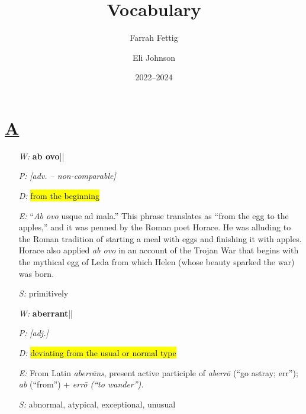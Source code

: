 \documentclass[11pt, table, dvipsnames, svgnames, x11names, xcdraw, titlepage]{article}
\title{Vocabulary}
\author{
    Farrah Fettig \and
    Eli Johnson
	}
\date{2022–2024}
\begin{document}

\maketitle




\section*{\underline{A}}

\begin{itemize}[itemsep=0pt, topsep=0pt]
\item[\textit{W:}] \textbf{ab ovo}\quad || \quad {}
\item[\textit{P:}] \textit{[adv. – non-comparable]}
\item[\textit{D:}] \hl{from the beginning}
\item[\textit{E:}] ``\textit{Ab ovo} usque ad mala.'' This phrase translates as ``from the egg to the apples,'' and it was penned by the Roman poet Horace. He was alluding to the Roman tradition of starting a meal with eggs and finishing it with apples. Horace also applied \textit{ab ovo} in an account of the Trojan War that begins with the mythical egg of Leda from which Helen (whose beauty sparked the war) was born.
\item[\textit{S:}] primitively
\end{itemize}

\null

\begin{itemize}[itemsep=0pt, topsep=0pt]
\item[\textit{W:}] \textbf{aberrant}\quad || \quad {}
\item[\textit{P:}] \textit{[adj.]}
\item[\textit{D:}] \hl{deviating from the usual or normal type}
\item[\textit{E:}] From Latin \textit{aberr\={a}ns}, present active participle of \textit{aberr\={o}} (``go astray; err''); \textit{ab} (``from'') + \textit{err\={o} (``to wander'').}
\item[\textit{S:}] abnormal, atypical, exceptional, unusual
\end{itemize}
\end{document}
